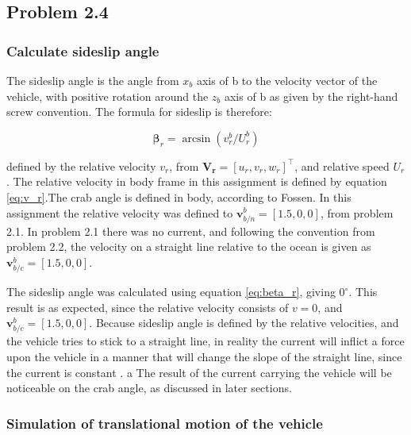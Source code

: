 
\subsection*{Problem 2.4}

\subsubsection*{Calculate sideslip angle}

The sideslip angle is the angle from $x_b$ axis of {b} to the velocity vector of the vehicle, with positive rotation around the $z_b$ axis of {b} as given by the right-hand screw convention. The formula for sideslip is therefore:

\begin{equation}
    \boldsymbol{\beta}_r = \arcsin( v^b_r/U^b_r)
    \label{eq:beta_r}
\end{equation}

defined by the relative velocity $v_r$, from $\mathbf{V_r} = [u_r,v_r,w_r]^\top$, and relative speed $U_r$. The relative velocity in body frame in this assignment is defined by equation \eqref{eq:v_r}.The crab angle is defined in body, according to Fossen. In this assignment the relative velocity was defined to $\mathbf{v}^b_{b/n} = [1.5, 0,0]$, from problem 2.1. In problem 2.1 there was no current, and following the convention from problem 2.2, the velocity on a straight line relative to the ocean is given as $\mathbf{v}^b_{b/c} = [1.5, 0,0]$.  

The sideslip angle was calculated using equation \eqref{eq:beta_r}, giving $0 ^\circ$. This result is as expected, since the relative velocity consists of $v=0$, and  $\mathbf{v}^b_{b/c} = [1.5, 0,0]$.  Because sideslip angle is defined by the relative velocities, and the vehicle tries to stick to a straight line, in reality the current will inflict a force upon the vehicle in a manner that will change the slope of the straight line, since the current is constant .  a   The result of the current carrying the vehicle will be noticeable on the crab angle, as discussed in later sections. 

\subsubsection*{Simulation of translational motion of the vehicle }

